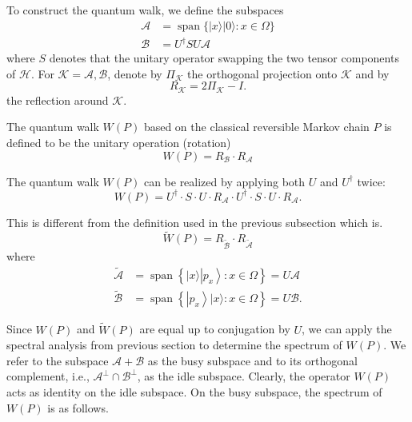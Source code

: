 To construct the quantum walk, we define the subspaces
$$
\begin{aligned}
	\mathcal{A} & =\operatorname{span}\{|x\rangle|0\rangle: x \in \Omega\} \\
	\mathcal{B} & =U^{\dagger} S U \mathcal{A}
\end{aligned}
$$
where $S$ denotes that the unitary operator swapping the two tensor components of $\mathcal{H}$. For $\mathcal{K}=\mathcal{A}, \mathcal{B}$, denote by $\Pi_{\mathcal{K}}$ the orthogonal projection onto $\mathcal{K}$ and by
$$
R_{\mathcal{K}}=2 \Pi_{\mathcal{K}}-I .
$$
the reflection around $\mathcal{K}$.
\begin{definition}
	

 The quantum walk $W(P)$ based on the classical reversible Markov chain $P$ is defined to be the unitary operation (rotation)
$$
W(P)=R_{\mathcal{B}} \cdot R_{\mathcal{A}}
$$

The quantum walk $W(P)$ can be realized by applying both $U$ and $U^{\dagger}$ twice:
$$
W(P)=U^{\dagger} \cdot S \cdot U \cdot R_{\mathcal{A}} \cdot U^{\dagger} \cdot S \cdot U \cdot R_{\mathcal{A}} .
$$

 This is different from the definition used in the previous subsection which is.
$$
\tilde{W}(P)=R_{\tilde{\mathcal{B}}} \cdot R_{\tilde{\mathcal{A}}}
$$
where
$$
\begin{aligned}
	\tilde{\mathcal{A}} & =\operatorname{span}\left\{|x\rangle\left|p_x\right\rangle: x \in \Omega\right\}=U \mathcal{A} \\
	\tilde{\mathcal{B}} & =\operatorname{span}\left\{\left|p_x\right\rangle|x\rangle: x \in \Omega\right\}=U \mathcal{B} .
\end{aligned}
$$
\end{definition}


Since $W(P)$ and $\tilde{W}(P)$ are equal up to conjugation by $U$, we can apply the spectral analysis from previous section to determine the spectrum of $W(P)$. We refer to the subspace $\mathcal{A}+\mathcal{B}$ as the busy subspace and to its orthogonal complement, i.e., $\mathcal{A}^{\perp} \cap \mathcal{B}^{\perp}$, as the idle subspace. Clearly, the operator $W(P)$ acts as identity on the idle subspace. On the busy subspace, the spectrum of $W(P)$ is as follows.

